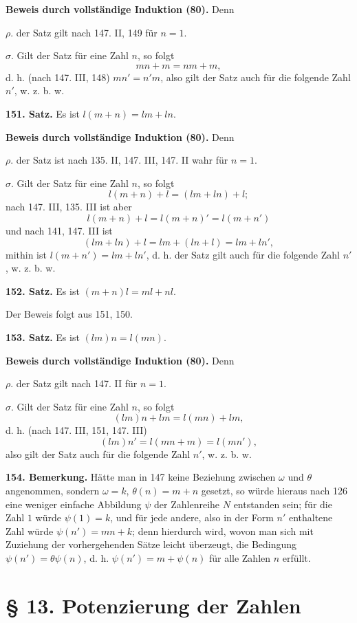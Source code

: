 \documentclass[11pt]{article}
\begin{document}
\noindent\textbf{Beweis durch vollständige Induktion (80).} Denn

\noindent $\rho.$ der Satz gilt nach 147. II, 149 für $n=1$.

\noindent $\sigma.$ Gilt der Satz für eine Zahl $n$, so folgt
\[
mn+m=nm+m,
\]
d. h. (nach 147. III, 148) $mn'=n'm$, also gilt der Satz auch für die folgende Zahl $n'$, w. z. b. w.

\noindent\textbf{151. Satz.} Es ist $l(m+n)=lm+ln$.

\noindent\textbf{Beweis durch vollständige Induktion (80).} Denn

\noindent $\rho.$ der Satz ist nach 135. II, 147. III, 147. II wahr für $n=1$.

\noindent $\sigma.$ Gilt der Satz für eine Zahl $n$, so folgt
\[
l(m+n)+l=(lm+ln)+l;
\]
nach 147. III, 135. III ist aber
\[
l(m+n)+l=l(m+n)'=l(m+n')
\]
und nach 141, 147. III ist
\[
(lm+ln)+l=lm+(ln+l)=lm+ln',
\]
mithin ist $l(m+n')=lm+ln'$, d. h. der Satz gilt auch für die folgende Zahl $n'$, w. z. b. w.

\noindent\textbf{152. Satz.} Es ist $(m+n)l=ml+nl$.

Der Beweis folgt aus 151, 150.

\noindent\textbf{153. Satz.} Es ist $(lm)n=l(mn)$.

\noindent\textbf{Beweis durch vollständige Induktion (80).} Denn

\noindent $\rho.$ der Satz gilt nach 147. II für $n=1$.

\noindent $\sigma.$ Gilt der Satz für eine Zahl $n$, so folgt
\[
(lm)n+lm=l(mn)+lm,
\]
d. h. (nach 147. III, 151, 147. III)
\[
(lm)n'=l(mn+m)=l(mn'),
\]
also gilt der Satz auch für die folgende Zahl $n'$, w. z. b. w.

\noindent\textbf{154. Bemerkung.} Hätte man in 147 keine Beziehung zwischen $\omega$ und $\theta$ angenommen, sondern $\omega=k$, $\theta(n)=m+n$ gesetzt, so würde hieraus nach 126 eine weniger einfache Abbildung $\psi$ der Zahlenreihe $N$ entstanden sein; für die Zahl $1$ würde $\psi(1)=k$, und für jede andere, also in der Form $n'$ enthaltene Zahl würde $\psi(n')=mn+k$; denn hierdurch wird, wovon man sich mit Zuziehung der vorhergehenden Sätze leicht überzeugt, die Bedingung $\psi(n')=\theta\psi(n)$, d. h. $\psi(n')=m+\psi(n)$ für alle Zahlen $n$ erfüllt.

\section*{\S{} 13. Potenzierung der Zahlen}
\end{document}
